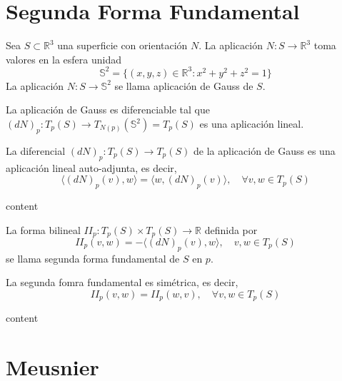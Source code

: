 \section{Segunda Forma Fundamental}

\begin{defn}
  Sea $S \subset \mathbb{R}^{3}$ una superficie con orientación $N$. La aplicación $N : S \to \mathbb{R}^{3}$ toma valores en la esfera unidad
  \[ 
    \mathbb{S}^{2} = \{ (x, y, z) \in \mathbb{R}^{3} : x^{2} + y^{2} + z^{2} = 1 \} 
  \] 
  La aplicación $N : S \to \mathbb{S}^{2}$ se llama aplicación de Gauss de $S$.
\end{defn}

\begin{obs}
  La aplicación de Gauss es diferenciable tal que $(d N)_{p} : T_{p}(S) \to T_{N(p)}(\mathbb{S}^{2}) = T_{p}(S)$ es una aplicación lineal. 
\end{obs}

\begin{prop}
  La diferencial $(d N)_{p} : T_{p}(S) \to T_{p}(S)$ de la aplicación de Gauss es una aplicación lineal auto-adjunta, es decir,
  \[ 
    \langle (d N)_{p}(v){ , }w \rangle = \langle w{ , }(d N)_{p}(v) \rangle, \quad \forall v, w \in T_{p}(S)
  \] 
\end{prop}

\begin{dem}
  content
\end{dem}

\begin{defn}
  La forma bilineal $II_{p} : T_{p}(S) \times T_{p}(S) \to \mathbb{R}$ definida por 
  \[
    II_{p}(v,w) = - \langle (d N)_{p}(v){ , }w \rangle, \quad v, w \in T_{p}(S)
  \] 
  se llama segunda forma fundamental de $S$ en $p$.
\end{defn}

\begin{prop}
  La segunda fomra fundamental es simétrica, es decir,
  \[ 
    II_{p}(v,w) = II_{p}(w,v), \quad \forall v, w \in T_{p}(S)
  \] 
\end{prop}

\begin{dem}
  content
\end{dem}

\section{Meusnier}

